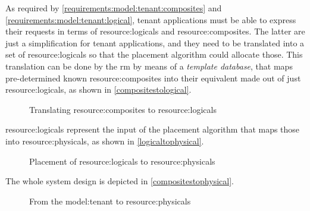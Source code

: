As required by \ref{requirements:model:tenant:composites} and \ref{requirements:model:tenant:logical}, tenant applications must be able to express their requests in terms of \glspl{resource:logical} and \glspl{resource:composite}.
The latter are just a simplification for tenant applications, and they need to be translated into a set of \glspl{resource:logical} so that the placement algorithm could allocate those.
This translation can be done by the \gls{rm} by means of a \textit{template database}, that maps pre-determined known \glspl{resource:composite} into their equivalent made out of just \glspl{resource:logical}, as shown in \autoref{compositestological}.

\begin{figure}[!htb]
    \centering
    \usebox{\compositestological}
    \caption{Translating \glspl{resource:composite} to \glspl{resource:logical}}
    \label{compositestological}
\end{figure}

\Glspl{resource:logical} represent the input of the placement algorithm that maps those into \glspl{resource:physical}, as shown in \autoref{logicaltophysical}.

\begin{figure}[!htb]
    \centering
    \usebox{\logicaltophysical}
    \caption{Placement of \glspl{resource:logical} to \glspl{resource:physical}}
    \label{logicaltophysical}
\end{figure}

The whole system design is depicted in \autoref{compositestophysical}.

\begin{figure}[!htb]
    \centering
    \usebox{\compositestophysical}
    \caption{From the \gls{model:tenant} to \glspl{resource:physical}}
    \label{compositestophysical}
\end{figure}